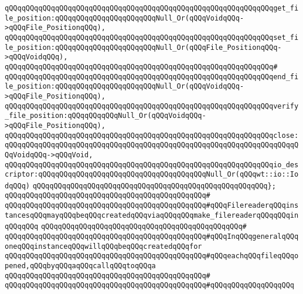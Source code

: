 \verb|qQQqqQQqqQQqqQQqqQQqqQQqqQQqqQQqqQQqqQQqqQQqqQQqqQQqqQQqqQQqqQQqget_file_position:qQQqqQQqqQQqqQQqqQQqqQQqNull_Or(qQQqVoidqQQq->qQQqFile_PositionqQQq),|\newline
\verb|qQQqqQQqqQQqqQQqqQQqqQQqqQQqqQQqqQQqqQQqqQQqqQQqqQQqqQQqqQQqqQQqset_file_position:qQQqqQQqqQQqqQQqqQQqqQQqNull_Or(qQQqFile_PositionqQQq->qQQqVoidqQQq),|\newline
\verb|qQQqqQQqqQQqqQQqqQQqqQQqqQQqqQQqqQQqqQQqqQQqqQQqqQQqqQQqqQQqqQQq#|\newline
\verb|qQQqqQQqqQQqqQQqqQQqqQQqqQQqqQQqqQQqqQQqqQQqqQQqqQQqqQQqqQQqqQQqend_file_position:qQQqqQQqqQQqqQQqqQQqqQQqNull_Or(qQQqVoidqQQq->qQQqFile_PositionqQQq),|\newline
\verb|qQQqqQQqqQQqqQQqqQQqqQQqqQQqqQQqqQQqqQQqqQQqqQQqqQQqqQQqqQQqqQQqverify_file_position:qQQqqQQqqQQqNull_Or(qQQqVoidqQQq->qQQqFile_PositionqQQq),|\newline
\newline
\verb|qQQqqQQqqQQqqQQqqQQqqQQqqQQqqQQqqQQqqQQqqQQqqQQqqQQqqQQqqQQqqQQqclose:qQQqqQQqqQQqqQQqqQQqqQQqqQQqqQQqqQQqqQQqqQQqqQQqqQQqqQQqqQQqqQQqqQQqqQQqVoidqQQq->qQQqVoid,|\newline
\verb|qQQqqQQqqQQqqQQqqQQqqQQqqQQqqQQqqQQqqQQqqQQqqQQqqQQqqQQqqQQqqQQqio_descriptor:qQQqqQQqqQQqqQQqqQQqqQQqqQQqqQQqqQQqqQQqNull_Or(qQQqwt::io::IodqQQq)|\newline
\verb|qQQqqQQqqQQqqQQqqQQqqQQqqQQqqQQqqQQqqQQqqQQqqQQqqQQqqQQq};|\newline
\verb|qQQqqQQqqQQqqQQqqQQqqQQqqQQqqQQqqQQqqQQqqQQqqQQq#|\newline
\verb|qQQqqQQqqQQqqQQqqQQqqQQqqQQqqQQqqQQqqQQqqQQqqQQq#qQQqFilereaderqQQqinstancesqQQqmayqQQqbeqQQqcreatedqQQqviaqQQqqQQqmake_filereaderqQQqqQQqinqQQqqQQq|\newline
\verb|qQQqqQQqqQQqqQQqqQQqqQQqqQQqqQQqqQQqqQQqqQQqqQQq#|\newline
\verb|qQQqqQQqqQQqqQQqqQQqqQQqqQQqqQQqqQQqqQQqqQQqqQQq#qQQqInqQQqgeneralqQQqoneqQQqinstanceqQQqwillqQQqbeqQQqcreatedqQQqfor|\newline
\verb|qQQqqQQqqQQqqQQqqQQqqQQqqQQqqQQqqQQqqQQqqQQqqQQq#qQQqeachqQQqfileqQQqopened,qQQqbyqQQqaqQQqcallqQQqtoqQQqa|\newline
\verb|qQQqqQQqqQQqqQQqqQQqqQQqqQQqqQQqqQQqqQQqqQQqqQQq#|\newline
\verb|qQQqqQQqqQQqqQQqqQQqqQQqqQQqqQQqqQQqqQQqqQQqqQQq#qQQqqQQqqQQqqQQqqQQq|\newline
